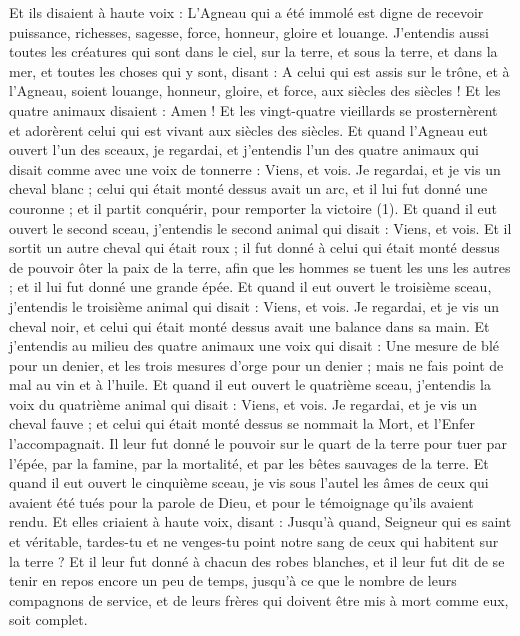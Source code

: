 \begin{multicols}{2}
Et ils disaient à haute voix : L'Agneau qui a été immolé est digne de recevoir puissance, richesses, sagesse, force, honneur, gloire et louange.
J'entendis aussi toutes les créatures qui sont dans le ciel, sur la terre, et sous la terre, et dans la mer, et toutes les choses qui y sont, disant : A celui qui est assis sur le trône, et à l'Agneau, soient louange, honneur, gloire, et force, aux siècles des siècles !
Et les quatre animaux disaient : Amen ! Et les vingt-quatre vieillards se prosternèrent et adorèrent celui qui est vivant aux siècles des siècles.
\VerseOne{}Et quand l'Agneau eut ouvert l'un des sceaux, je regardai, et j'entendis l'un des quatre animaux qui disait comme avec une voix de tonnerre : Viens, et vois.
Je regardai, et je vis un cheval blanc ; celui qui était monté dessus avait un arc, et il lui fut donné une couronne ; et il partit conquérir, pour remporter la victoire (1).
Et quand il eut ouvert le second sceau, j'entendis le second animal qui disait : Viens, et vois.
Et il sortit un autre cheval qui était roux ; il fut donné à celui qui était monté dessus de pouvoir ôter la paix de la terre, afin que les hommes se tuent les uns les autres ; et il lui fut donné une grande épée.
Et quand il eut ouvert le troisième sceau, j'entendis le troisième animal qui disait : Viens, et vois. Je regardai, et je vis un cheval noir, et celui qui était monté dessus avait une balance dans sa main.
Et j'entendis au milieu des quatre animaux une voix qui disait : Une mesure de blé pour un denier, et les trois mesures d'orge pour un denier ; mais ne fais point de mal au vin et à l'huile.
Et quand il eut ouvert le quatrième sceau, j'entendis la voix du quatrième animal qui disait : Viens, et vois.
Je regardai, et je vis un cheval fauve ; et celui qui était monté dessus se nommait la Mort, et l'Enfer l’accompagnait. Il leur fut donné le pouvoir sur le quart de la terre pour tuer par l'épée, par la famine, par la mortalité, et par les bêtes sauvages de la terre.
Et quand il eut ouvert le cinquième sceau, je vis sous l'autel les âmes de ceux qui avaient été tués pour la parole de Dieu, et pour le témoignage qu'ils avaient rendu.
Et elles criaient à haute voix, disant : Jusqu'à quand, Seigneur qui es saint et véritable, tardes-tu et ne venges-tu point notre sang de ceux qui habitent sur la terre ?
Et il leur fut donné à chacun des robes blanches, et il leur fut dit de se tenir en repos encore un peu de temps, jusqu'à ce que le nombre de leurs compagnons de service, et de leurs frères qui doivent être mis à mort comme eux, soit complet.

\end{multicols}
